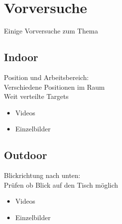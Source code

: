 \section{Vorversuche}
Einige Vorversuche zum Thema
\subsection{Indoor}
Position und Arbeitsbereich:\\
Verschiedene Positionen im Raum\\
Weit verteilte Targets
\begin{itemize}
	\item Videos
	\item Einzelbilder
\end{itemize}
\subsection{Outdoor}
Blickrichtung nach unten:\\
Prüfen ob Blick auf den Tisch möglich
\begin{itemize}
	\item Videos
	\item Einzelbilder
\end{itemize}